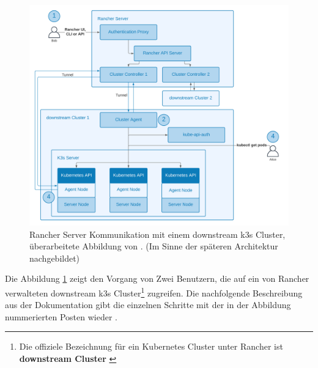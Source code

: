 \begin{figure}[!htb]
  \centering
  \includegraphics[width=0.8\columnwidth]{images/RancherArchitekturClusterController.png}
  \caption{Rancher Server Kommunikation mit einem downstream k3s Cluster, überarbeitete Abbildung von \cite{rancherArchitecture}. (Im Sinne der späteren Architektur nachgebildet)}
  \label{fig:rancherarchitektur}
\end{figure}

Die Abbildung \ref{fig:rancherarchitektur} zeigt den Vorgang von Zwei Benutzern, 
die auf ein von Rancher verwalteten downstream k3s Cluster\footnote{Die offiziele Bezeichnung für ein Kubernetes Cluster unter Rancher ist \textbf{downstream Cluster} \cite{rancherArchitectureRecommendations}} zugreifen.
Die nachfolgende Beschreibung aus der Dokumentation gibt die einzelnen Schritte mit der in der Abbildung nummerierten Posten wieder \cite{rancherArchitecture}.


